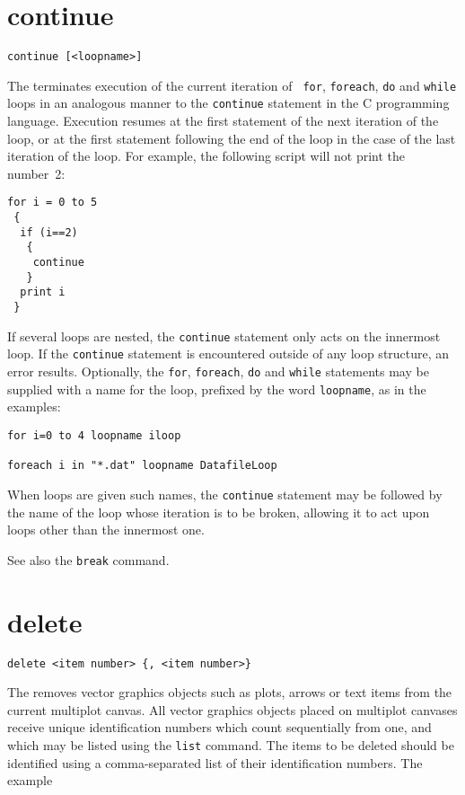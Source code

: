 \section{continue}

\begin{verbatim}
continue [<loopname>]
\end{verbatim}

The  terminates execution of the current iteration of {\tt
for}, {\tt foreach}, {\tt do} and {\tt while} loops in an analogous manner to
the {\tt continue} statement in the C programming language. Execution resumes
at the first statement of the next iteration of the loop, or at the first
statement following the end of the loop in the case of the last iteration of
the loop.  For example, the following script will not print the number~2:

\begin{verbatim}
for i = 0 to 5
 {
  if (i==2)
   {
    continue
   }
  print i
 }
\end{verbatim}

If several loops are nested, the {\tt continue} statement only
acts on the innermost loop. If the {\tt continue} statement is encountered outside of any
loop structure, an error results. Optionally, the {\tt for}, {\tt foreach},
{\tt do} and {\tt while} statements may be supplied with a name for the loop, prefixed by
the word {\tt loopname}, as in the examples:

\begin{verbatim}
for i=0 to 4 loopname iloop

foreach i in "*.dat" loopname DatafileLoop
\end{verbatim}

\noindent When loops are given such names, the {\tt continue} statement may be
followed by the name of the loop whose iteration is to be broken, allowing it
to act upon loops other than the innermost one.

See also the {\tt break} command.


\section{delete}

\begin{verbatim}
delete <item number> {, <item number>}
\end{verbatim}

The  removes vector graphics objects such as plots, arrows or
text items from the current multiplot canvas. All vector graphics objects
placed on multiplot canvases receive unique identification numbers which count
sequentially from one, and which may be listed using the {\tt list} command.
The items to be deleted should be identified using a comma-separated list of
their identification numbers. The example

